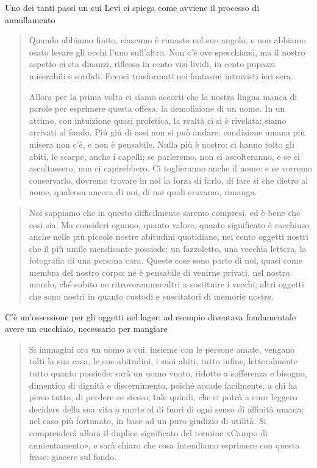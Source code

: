 \documentclass[a4paper, twoside, titlepage]{book}
\newcommand{\citazione}[1]{%
  \begin{quotation}
  \begin{linenumbers}
  \modulolinenumbers[5]
  \begingroup
  \setlength{\parindent}{0cm}
  \noindent #1
  \endgroup
  \end{linenumbers}
  \end{quotation}\setcounter{linenumber}{1}
  }
\begin{document}
Uno dei tanti passi un cui Levi ci spiega come avviene il processo di annullamento
\citazione{ Quando abbiamo finito, ciascuno è rimasto nel suo angolo, e non abbiamo osato levare gli occhi l'uno sull'altro. Non c'è ove specchiarsi, ma il nostro aspetto ci sta dinanzi, riflesso in cento visi lividi, in cento pupazzi miserabili e sordidi. Eccoci trasformati nei fantasmi intravisti ieri sera.

Allora per la prima volta ci siamo accorti che la nostra lingua manca di parole per esprimere questa offesa, la demolizione di un uomo. In un attimo, con intuizione quasi profetica, la realtà ci si è rivelata: siamo arrivati al fondo. Piú giú di cosi non si può andare: condizione umana più misera non c'è, e non è pensabile. Nulla più è nostro: ci hanno tolto gli abiti, le scarpe, anche i capelli; se parleremo, non ci ascolteranno, e se ci ascoltassero, non ci capirebbero. Ci toglieranno anche il nome: e se vorremo conservarlo, dovremo trovare in noi la forza di farlo, di fare si che dietro al nome, qualcosa ancora di noi, di noi quali eravamo, rimanga.}

\citazione{ Noi sappiamo che in questo difficilmente saremo compresi, ed è bene che cosi sia. Ma consideri ognuno, quanto valore, quanto significato è racchiuso anche nelle più piccole nostre abitudini quotidiane, nei cento oggetti nostri che il più umile mendicante possiede: un fazzoletto, una vecchia lettera, la fotografia di una persona cara. Queste cose sono parte di noi, quasi come membra del nostro corpo; né è pensabile di venirne privati, nel nostro mondo, ché subito ne ritroveremmo altri a sostituire i vecchi, altri oggetti che sono nostri in quanto custodi e suscitatori di memorie nostre.}

C'è un'ossessione per gli oggetti nel lager: ad esempio diventava fondamentale avere un cucchiaio, necessario per mangiare
\citazione{ Si immagini ora un uomo a cui, insieme con le persone amate, vengano tolti la sua casa, le sue abitudini, i suoi abiti, tutto infine, letteralmente tutto quanto possiede: sarà un uomo vuoto, ridotto a sofferenza e bisogno, dimentico di dignità e discernimento, poiché accade facilmente, a chi ha perso tutto, di perdere se stesso; tale quindi, che si potrà a cuor leggero decidere della sua vita o morte al di fuori di ogni senso di affinità umana; nel caso più fortunato, in base ad un puro giudizio di utilità. Si comprenderà allora il duplice significato del termine «Campo di annientamento», e sarà chiaro che cosa intendiamo esprimere con questa frase: giacere sul fondo.}
\end{document}
